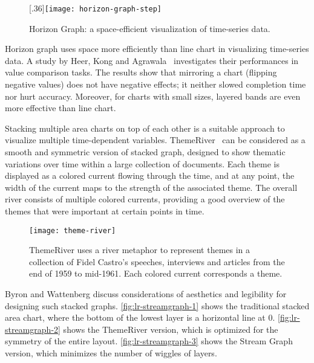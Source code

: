 \begin{figure}[!htb]
\centering
{}[.36\columnwidth]{\texttt{[image: horizon-graph-step]}}
\hfill
{}
\caption{Horizon Graph: a space-efficient visualization of time-series data. }
\label{fig:lr-horizon-graph}
\end{figure}

Horizon graph uses space more efficiently than line chart in visualizing time-series data. A study by Heer, Kong and Agrawala~\cite{Heer2009a} investigates their performances in value comparison tasks. The results show that mirroring a chart (flipping negative values) does not have negative effects; it neither slowed completion time nor hurt accuracy. Moreover, for charts with small sizes, layered bands are even more effective than line chart.

Stacking multiple area charts on top of each other is a suitable approach to visualize multiple time-dependent variables. ThemeRiver~\cite{Havre2002} can be considered as a smooth and symmetric version of stacked graph, designed to show thematic variations over time within a large collection of documents. Each theme is displayed as a colored current flowing through the time, and at any point, the width of the current maps to the strength of the associated theme. The overall river consists of multiple colored currents, providing a good overview of the themes that were important at certain points in time. 

\begin{figure}[!htb]
	\centering
	\texttt{[image: theme-river]}
	\caption{ThemeRiver uses a river metaphor to represent themes in a collection of Fidel Castro's speeches, interviews and articles from the end of 1959 to mid-1961. Each colored current corresponds a theme. }
	\label{fig:lr-theme-river}
\end{figure}

Byron and Wattenberg discuss considerations of aesthetics and legibility for designing such stacked graphs. \autoref{fig:lr-streamgraph-1} shows the traditional stacked area chart, where the bottom of the lowest layer is a horizontal line at 0. \autoref{fig:lr-streamgraph-2} shows the ThemeRiver version, which is optimized for the symmetry of the entire layout. \autoref{fig:lr-streamgraph-3} shows the Stream Graph~\cite{Byron2008} version, which minimizes the number of wiggles of layers.

